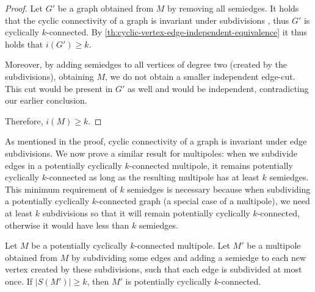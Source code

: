 \documentclass[12pt, twoside]{book}
\begin{document}
\begin{proof}
	Let $G'$ be a graph obtained from $M$ by removing all semiedges. It holds that the cyclic connectivity of a graph is invariant under subdivisions \cite{atoms-of-cyclic}, thus $G'$ is cyclically $k$-connected. By \cref{th:cyclic-vertex-edge-independent-equivalence} it thus holds that $i(G')\geq k$.
	
	Moreover, by adding semiedges to all vertices of degree two (created by the subdivisions), obtaining $M$, we do not obtain a smaller independent edge-cut. This cut would be present in $G'$ as well and would be independent, contradicting our earlier conclusion.
	
	Therefore, $i(M)\geq k$.
\end{proof}

As mentioned in the proof, cyclic connectivity of a graph is invariant under edge subdivisions. We now prove a similar result for multipoles: when we subdivide edges in a potentially cyclically $k$-connected multipole, it remains potentially cyclically $k$-connected as long as the resulting multipole has at least $k$ semiedges. This minimum requirement of $k$ semiedges is necessary because when subdividing a potentially cyclically $k$-connected graph (a special case of a multipole), we need at least $k$ subdivisions so that it will remain potentially cyclically $k$-connected, otherwise it would have less than $k$ semiedges.

\begin{theorem}\label{th:subdivisions-potentially-cyclically-connected}
	Let $M$ be a potentially cyclically $k$-connected multipole. Let $M'$ be a multipole obtained from $M$ by subdividing some edges and adding a semiedge to each new vertex created by these subdivisions, such that each edge is subdivided at most once. If $|S(M')|\geq k$, then $M'$ is potentially cyclically $k$-connected.
\end{theorem}
\end{document}
